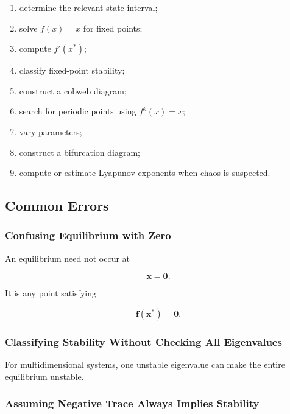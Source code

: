 \begin{enumerate}
    \item determine the relevant state interval;
    \item solve \(f(x)=x\) for fixed points;
    \item compute \(f'(x^*)\);
    \item classify fixed-point stability;
    \item construct a cobweb diagram;
    \item search for periodic points using \(f^k(x)=x\);
    \item vary parameters;
    \item construct a bifurcation diagram;
    \item compute or estimate Lyapunov exponents when chaos is suspected.
\end{enumerate}

\subsection{Common Errors}
\label{subsec:dynamical-systems-common-errors}

\subsubsection{Confusing Equilibrium with Zero}

An equilibrium need not occur at

\[
\mathbf{x}=\mathbf{0}.
\]

It is any point satisfying

\[
\mathbf{f}(\mathbf{x}^*)=\mathbf{0}.
\]

\subsubsection{Classifying Stability Without Checking All Eigenvalues}

For multidimensional systems, one unstable eigenvalue can make the entire
equilibrium unstable.

\subsubsection{Assuming Negative Trace Always Implies Stability}

